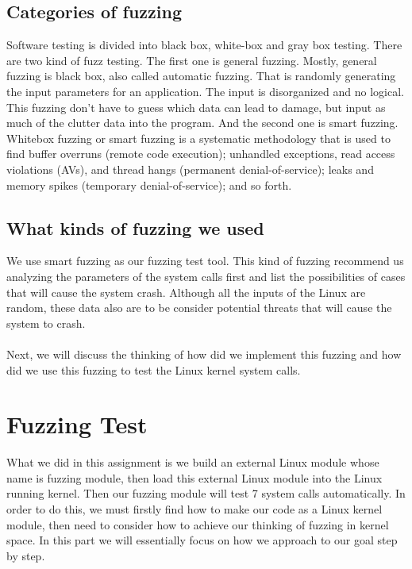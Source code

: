 \documentclass[twoside]{article}
\begin{document}
\begin{multicols}{2}
\subsection{Categories of fuzzing}
Software testing is divided into black box, white-box and gray box testing. There are two kind of fuzz testing. The first one is general fuzzing. Mostly, general fuzzing is black box, also called automatic fuzzing. That is randomly generating the input parameters for an application. The input is disorganized and no logical. This fuzzing don’t  have to guess which data can lead to damage, but input as much of the clutter data into the program.  And the second one is smart fuzzing. Whitebox fuzzing or smart fuzzing is a systematic methodology that is used to find buffer overruns (remote code execution); unhandled exceptions, read access violations (AVs), and thread hangs (permanent denial-of-service); leaks and memory spikes (temporary denial-of-service); and so forth.\cite{demott2006fuzzing,godefroid2008grammar}
\subsection{What kinds of fuzzing we used}
We use smart fuzzing as our fuzzing test tool. This kind of fuzzing recommend us analyzing the parameters of the system calls first and list the possibilities of cases that will cause the system crash. Although all the inputs of the Linux are random, these data also are to be consider potential threats  that  will cause the system to crash.\\\\
Next, we will discuss the thinking of how did we implement this fuzzing and how did we use this fuzzing to test the Linux kernel system calls.
\section{Fuzzing Test}
What we did in this assignment is we build an external Linux module whose name is fuzzing module, then load this external Linux module into the Linux running kernel. Then our fuzzing module will test 7 system calls automatically. In order to do this, we must firstly find how to make our code as a Linux kernel module, then need to consider how to achieve our thinking of fuzzing in kernel space. In this part we will essentially focus on how we approach to our goal step by step.

\end{multicols}
\end{document}
